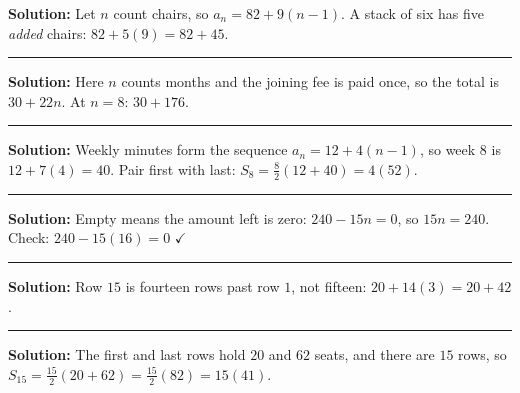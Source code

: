 \documentclass[12pt]{article}
\begin{document}



\textbf{Solution:} Let $n$ count chairs, so $a_n = 82 + 9(n-1)$. A stack of six has five \emph{added} chairs: $82 + 5(9) = 82 + 45$. 

\vspace{0.2cm}\noindent\rule{\linewidth}{0.2pt}


\textbf{Solution:} Here $n$ counts months and the joining fee is paid once, so the total is $30 + 22n$. At $n = 8$: $30 + 176$. 

\vspace{0.2cm}\noindent\rule{\linewidth}{0.2pt}


\textbf{Solution:} Weekly minutes form the sequence $a_n = 12 + 4(n-1)$, so week $8$ is $12 + 7(4) = 40$. Pair first with last: $S_8 = \frac{8}{2}(12 + 40) = 4(52)$. 

\vspace{0.2cm}\noindent\rule{\linewidth}{0.2pt}


\textbf{Solution:} Empty means the amount left is zero: $240 - 15n = 0$, so $15n = 240$. Check: $240 - 15(16) = 0$ $\checkmark$ 

\vspace{0.2cm}\noindent\rule{\linewidth}{0.2pt}


\textbf{Solution:} Row $15$ is fourteen rows past row $1$, not fifteen: $20 + 14(3) = 20 + 42$. 

\vspace{0.2cm}\noindent\rule{\linewidth}{0.2pt}


\textbf{Solution:} The first and last rows hold $20$ and $62$ seats, and there are $15$ rows, so $S_{15} = \frac{15}{2}(20 + 62) = \frac{15}{2}(82) = 15(41)$. 
\end{document}

